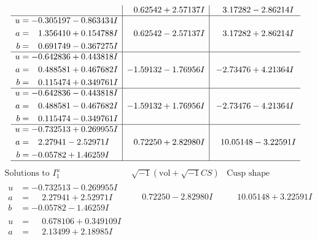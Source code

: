 \documentclass[1p]{elsarticle_modified}
\theoremstyle{definition}
\newcommand{\I}{\sqrt{-1}}
\begin{document}
$$\begin{array}{c|c|c}
 & \phantom{-}0.62542 + 2.57137 I & \phantom{-}3.17282 - 2.86214 I \\ \hline\begin{aligned}
u &= -0.305197 - 0.863434 I \\
a &= \phantom{-}1.356410 + 0.154788 I \\
b &= \phantom{-}0.691749 - 0.367275 I\end{aligned}
 & \phantom{-}0.62542 - 2.57137 I & \phantom{-}3.17282 + 2.86214 I \\ \hline\begin{aligned}
u &= -0.642836 + 0.443818 I \\
a &= \phantom{-}0.488581 + 0.467682 I \\
b &= \phantom{-}0.115474 + 0.349761 I\end{aligned}
 & -1.59132 - 1.76956 I & -2.73476 + 4.21364 I \\ \hline\begin{aligned}
u &= -0.642836 - 0.443818 I \\
a &= \phantom{-}0.488581 - 0.467682 I \\
b &= \phantom{-}0.115474 - 0.349761 I\end{aligned}
 & -1.59132 + 1.76956 I & -2.73476 - 4.21364 I \\ \hline\begin{aligned}
u &= -0.732513 + 0.269955 I \\
a &= \phantom{-}2.27941 - 2.52971 I \\
b &= -0.05782 + 1.46259 I\end{aligned}
 & \phantom{-}0.72250 + 2.82980 I & \phantom{-}10.05148 - 3.22591 I\\
 \hline 
 \end{array}$$\newpage$$\begin{array}{c|c|c}  
\text{Solutions to }I^u_{1}& \I (\text{vol} + \sqrt{-1}CS) & \text{Cusp shape}\\
 \hline 
\begin{aligned}
u &= -0.732513 - 0.269955 I \\
a &= \phantom{-}2.27941 + 2.52971 I \\
b &= -0.05782 - 1.46259 I\end{aligned}
 & \phantom{-}0.72250 - 2.82980 I & \phantom{-}10.05148 + 3.22591 I \\ \hline\begin{aligned}
u &= \phantom{-}0.678106 + 0.349109 I \\
a &= \phantom{-}2.13499 + 2.18985 I \\

\end{aligned}
\end{array}$$
\end{document}
